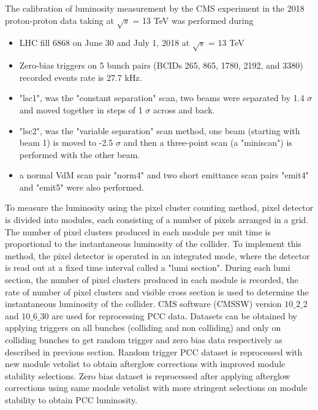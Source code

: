 The calibration of luminosity measurement by the CMS experiment in the 2018 proton-proton data taking at $\sqrt{s}$ = 13 TeV was performed during

\begin{itemize}
\item LHC fill 6868 on June 30 and July 1, 2018 at $\sqrt{s}$ = 13 TeV
\item Zero-bias triggers on 5 bunch pairs (BCIDs 265, 865, 1780, 2192, and 3380)
recorded events rate is 27.7 kHz. 
\item "lsc1", was the "constant separation" scan, two beams were separated by 1.4 $\sigma$ and moved together in steps of 1 $\sigma$ across and back.
\item "lsc2", was the "variable separation" scan method, one beam (starting with beam 1) is moved to -2.5 $\sigma$ and then a three-point scan (a "miniscan") is performed with the other beam.
\item a normal VdM scan pair "norm4" and two short emittance scan pairs "emit4" and "emit5" were also performed.
\end{itemize}

To measure the luminosity using the pixel cluster counting method, pixel detector is divided into modules, each consisting of a number of pixels arranged in a grid. The number of pixel clusters produced in each module per unit time is proportional to the instantaneous luminosity of the collider. To implement this method, the pixel detector is operated in an integrated mode, where the detector is read out at a fixed time interval called a "lumi section". During each lumi section, the number of pixel clusters produced in each module is recorded, the rate of number of pixel clusters and visible cross section is used to determine the instantaneous luminosity of the collider. CMS software (CMSSW) version $10{\_}2{\_}2$  and $10{\_}6{\_}30$ are used for reprocessing PCC data. Datasets can be obtained by applying triggers on all bunches (colliding and non colliding) and only on colliding bunches to get random trigger and zero bias data respectively as described in previous section. Random trigger PCC dataset is reprocessed with new module vetolist to obtain afterglow corrections with improved module stability selections. Zero bias dataset is reprocessed after applying afterglow corrections using same module vetolist with more stringent selections on module stability to obtain PCC luminosity. 

